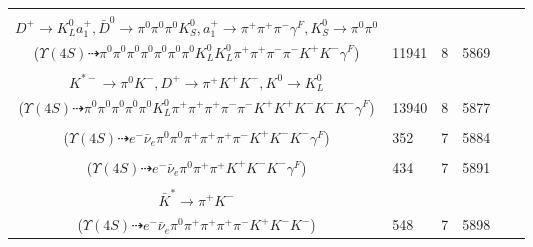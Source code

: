 \documentclass[landscape]{article}
\newcounter{rownumbers}
\newcommand\rn{\stepcounter{rownumbers}\arabic{rownumbers}}
\newcommand{\EOL}{\\} %
\newcommand{\topoTags}[1]{#1} %
\begin{document}
\begin{longtable}{clcccc}
\rn & \makecell[l]{ $ 
\Upsilon(4S) \rightarrow B^{0} \bar{B}^{0} ,
B^{0} \rightarrow \pi^{0} K^{+} K^{-} ,
\bar{B}^{0} \rightarrow \bar{K}^{0} D^{*+} D^{*-} ,
\bar{K}^{0} \rightarrow K_{L}^{0} ,
D^{*+} \rightarrow \pi^{0} D^{+} ,
D^{*-} \rightarrow \pi^{-} \bar{D}^{0} ,
$ \\ $
D^{+} \rightarrow K_{L}^{0} a_{1}^{+} ,
\bar{D}^{0} \rightarrow \pi^{0} \pi^{0} \pi^{0} K_{S}^{0} ,
a_{1}^{+} \rightarrow \pi^{+} \pi^{+} \pi^{-} \gamma^{F} ,
K_{S}^{0} \rightarrow \pi^{0} \pi^{0} 
$ \\ ($
\Upsilon(4S) \dashrightarrow \pi^{0} \pi^{0} \pi^{0} \pi^{0} \pi^{0} \pi^{0} \pi^{0} K_{L}^{0} K_{L}^{0} \pi^{+} \pi^{+} \pi^{-} \pi^{-} K^{+} K^{-} \gamma^{F} 
$) } & \topoTags{11941 & }8 & 5869 \EOL

\rn & \makecell[l]{ $ 
\Upsilon(4S) \rightarrow B^{0} \bar{B}^{0} ,
B^{0} \rightarrow \pi^{0} K^{+} K^{-} \gamma^{F} ,
\bar{B}^{0} \rightarrow \pi^{+} \rho^{-} \omega K^{*} K^{*-} D^{+} ,
\rho^{-} \rightarrow \pi^{0} \pi^{-} ,
\omega \rightarrow \pi^{0} \pi^{+} \pi^{-} ,
K^{*} \rightarrow \pi^{0} K^{0} ,
$ \\ $
K^{*-} \rightarrow \pi^{0} K^{-} ,
D^{+} \rightarrow \pi^{+} K^{+} K^{-} ,
K^{0} \rightarrow K_{L}^{0} 
$ \\ ($
\Upsilon(4S) \dashrightarrow \pi^{0} \pi^{0} \pi^{0} \pi^{0} \pi^{0} K_{L}^{0} \pi^{+} \pi^{+} \pi^{+} \pi^{-} \pi^{-} K^{+} K^{+} K^{-} K^{-} K^{-} \gamma^{F} 
$) } & \topoTags{13940 & }8 & 5877 \EOL

\rn & \makecell[l]{ $ 
\Upsilon(4S) \rightarrow B^{0} \bar{B}^{0} ,
B^{0} \rightarrow \pi^{0} K^{+} K^{-} ,
\bar{B}^{0} \rightarrow e^{-} \bar{\nu}_{e} D^{*+} \gamma^{F} ,
D^{*+} \rightarrow \pi^{+} D^{0} ,
D^{0} \rightarrow \pi^{+} \omega K^{-} ,
\omega \rightarrow \pi^{0} \pi^{+} \pi^{-} 
$ \\ ($
\Upsilon(4S) \dashrightarrow e^{-} \bar{\nu}_{e} \pi^{0} \pi^{0} \pi^{+} \pi^{+} \pi^{+} \pi^{-} K^{+} K^{-} K^{-} \gamma^{F} 
$) } & \topoTags{352 & }7 & 5884 \EOL

\rn & \makecell[l]{ $ 
\Upsilon(4S) \rightarrow B^{0} \bar{B}^{0} ,
B^{0} \rightarrow \pi^{0} K^{+} K^{-} ,
\bar{B}^{0} \rightarrow e^{-} \bar{\nu}_{e} D^{+} \gamma^{F} ,
D^{+} \rightarrow \pi^{+} \pi^{+} K^{-} 
$ \\ ($
\Upsilon(4S) \dashrightarrow e^{-} \bar{\nu}_{e} \pi^{0} \pi^{+} \pi^{+} K^{+} K^{-} K^{-} \gamma^{F} 
$) } & \topoTags{434 & }7 & 5891 \EOL

\rn & \makecell[l]{ $ 
\Upsilon(4S) \rightarrow B^{0} \bar{B}^{0} ,
B^{0} \rightarrow \pi^{0} K^{+} K^{-} ,
\bar{B}^{0} \rightarrow e^{-} \bar{\nu}_{e} D^{*+} ,
D^{*+} \rightarrow \pi^{+} D^{0} ,
D^{0} \rightarrow \rho^{0} \bar{K}^{*} ,
\rho^{0} \rightarrow \pi^{+} \pi^{-} ,
$ \\ $
\bar{K}^{*} \rightarrow \pi^{+} K^{-} 
$ \\ ($
\Upsilon(4S) \dashrightarrow e^{-} \bar{\nu}_{e} \pi^{0} \pi^{+} \pi^{+} \pi^{+} \pi^{-} K^{+} K^{-} K^{-} 
$) } & \topoTags{548 & }7 & 5898 \EOL


\end{longtable}
\end{document}

